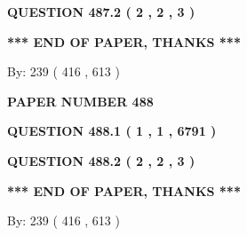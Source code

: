 \documentclass[12pt]{article}
\begin{document}
{\textbf{\Large{QUESTION
487.2 
 ( 2 , 2 , 3 )
}}}
  
  
   
   
 \vspace{0.2in}
 
   
   
   
   
\vspace{1.0in} 
{\textbf{\large{ *** END OF PAPER, THANKS *** }}} 
   
   
\hspace{1.0in} By: 
 239 ( 416 ,  613 )
   
   
   
   
\newpage 
\setcounter{page}{ 
   488001 } 
   
   
   
   
 {\textbf{ \Large{ PAPER NUMBER  488  }}}
   
   
\vspace{0.2in}
   
   
   
   
   
   
 \vspace{0.2in}
 
 
 
 
   
   
  
\vspace{0.2in}
  
{\textbf{\Large{QUESTION
488.1 
 ( 1 , 1 , 6791 )
}}}
  
  
  
\vspace{0.2in}
  
{\textbf{\Large{QUESTION
488.2 
 ( 2 , 2 , 3 )
}}}
  
  
   
   
 \vspace{0.2in}
 
   
   
   
   
\vspace{1.0in} 
{\textbf{\large{ *** END OF PAPER, THANKS *** }}} 
   
   
\hspace{1.0in} By: 
 239 ( 416 ,  613 )
   
   
   
   
\newpage 
\setcounter{page}{ 
   489001 } 
   
   
   
\end{document}
